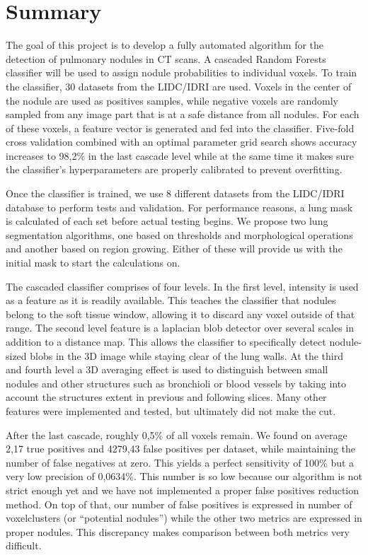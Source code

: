 \section*{Summary} %

The goal of this project is to develop a fully automated algorithm for the
detection of pulmonary nodules in CT scans. A cascaded Random Forests classifier
will be used to assign nodule probabilities to individual voxels. To train the
classifier, 30 datasets from the LIDC/IDRI are used. Voxels in the center of the
nodule are used as positives samples, while negative voxels are randomly sampled
from any image part that is at a safe distance from all nodules. For each of
these voxels, a feature vector is generated and fed into the classifier.
Five-fold cross validation combined with an optimal parameter grid search shows
accuracy increases to 98,2\% in the last cascade level while at the same time
it makes sure the classifier's hyperparameters are properly calibrated to
prevent overfitting.

Once the classifier is trained, we use 8 different datasets from the LIDC/IDRI
database to perform tests and validation. For performance reasons, a lung mask
is calculated of each set before actual testing begins. We propose two lung
segmentation algorithms, one based on thresholds and morphological operations
and another based on region growing. Either of these will provide us with the
initial mask to start the calculations on.

The cascaded classifier comprises of four levels. In the first level, intensity
is used as a feature as it is readily available. This teaches the classifier
that nodules belong to the soft tissue window, allowing it to discard any voxel
outside of that range. The second level feature is a laplacian blob detector
over several scales in addition to a distance map. This allows the classifier to
specifically detect nodule-sized blobs in the 3D image while staying clear of
the lung walls. At the third and fourth level a 3D averaging effect is used to
distinguish between small nodules and other structures such as bronchioli or
blood vessels by taking into account the structures extent in previous and
following slices. Many other features were implemented and tested, but
ultimately did not make the cut.

After the last cascade, roughly 0,5\% of all voxels remain. We found on average
2,17 true positives and 4279,43 false positives per dataset, while maintaining
the number of false negatives at zero. This yields a perfect sensitivity of
100\% but a very low precision of 0,0634\%. This number is so low because our
algorithm is not strict enough yet and we have not implemented a proper false
positives reduction method. On top of that, our number of false positives is
expressed in number of voxelclusters (or ``potential nodules'') while the other
two metrics are expressed in proper nodules. This discrepancy makes comparison
between both metrics very difficult.

